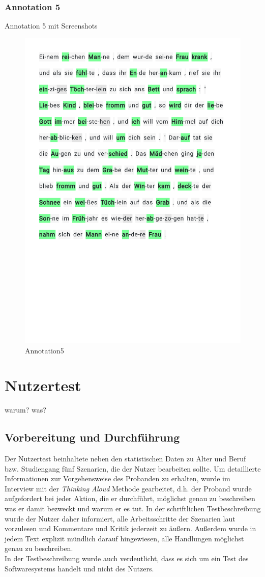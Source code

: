 \subsubsection{Annotation 5}
Annotation 5 mit Screenshots
\begin{figure}[h!]
	\centering
	\includegraphics[width=.7\linewidth, frame]{figures/evaluation/annotation5}
	\caption{Annotation5}
	\label{fig:frontend-home}
\end{figure}
\newpage

\section{Nutzertest}

warum? was?

\subsection{Vorbereitung und Durchführung}

Der Nutzertest beinhaltete neben den statistischen Daten zu Alter und Beruf bzw. Studiengang fünf Szenarien, die der Nutzer bearbeiten sollte. Um detaillierte Informationen zur Vorgehensweise des Probanden zu erhalten, wurde im Interview mit der \textit{Thinking Aloud} Methode gearbeitet, d.h. der Proband wurde aufgefordert bei jeder Aktion, die er durchführt, möglichst genau zu beschreiben was er damit bezweckt und warum er es tut.  In der schriftlichen Testbeschreibung wurde der Nutzer daher informiert, alle Arbeitsschritte der Szenarien laut vorzulesen und Kommentare und Kritik jederzeit zu äußern. Außerdem wurde in jedem Text explizit mündlich darauf hingewiesen, alle Handlungen möglichst genau zu beschreiben.\\
In der Testbeschreibung wurde auch verdeutlicht, dass es sich um ein Test des Softwaresystems handelt und nicht des Nutzers. \\

